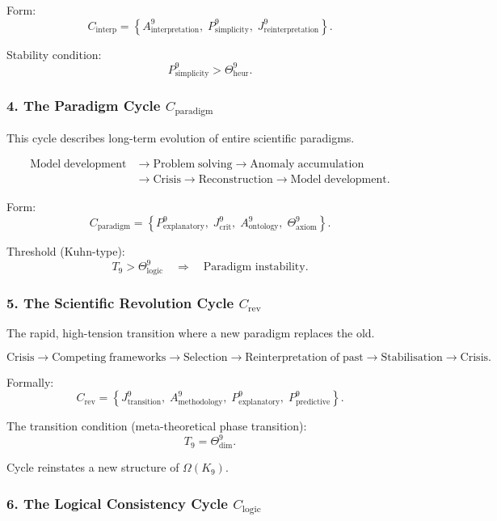 Form:
\[
 C_{\mathrm{interp}}
  =
  \left\{
    A^9_{\mathrm{interpretation}},\;
    P^9_{\mathrm{simplicity}},\;
    J^9_{\mathrm{reinterpretation}}
  \right\}.
\]

Stability condition:
\[
  P^9_{\mathrm{simplicity}} >
  \Theta^9_{\mathrm{heur}}.
\]


\subsubsection{4. The Paradigm Cycle $C_{\mathrm{paradigm}}$}

This cycle describes long-term evolution of entire scientific paradigms.

\[
  \begin{aligned}
  \mathrm{Model\;development}
  &\to \mathrm{Problem\;solving}
  \to \mathrm{Anomaly\;accumulation}\\
  &\to \mathrm{Crisis}
  \to \mathrm{Reconstruction}
  \to \mathrm{Model\;development}.
  \end{aligned}
\]

Form:
\[
 C_{\mathrm{paradigm}}
  =
  \left\{
    P^9_{\mathrm{explanatory}},\;
    J^9_{\mathrm{crit}},\;
    A^9_{\mathrm{ontology}},\;
    \Theta^9_{\mathrm{axiom}}
  \right\}.
\]

Threshold (Kuhn-type):
\[
  T_9 > \Theta^9_\mathrm{logic}
  \quad\Rightarrow\quad
  \text{Paradigm instability}.
\]


\subsubsection{5. The Scientific Revolution Cycle $C_{\mathrm{rev}}$}

The rapid, high-tension transition where a new paradigm replaces the old.

\[
  \mathrm{Crisis}
  \to
  \mathrm{Competing\;frameworks}
  \to
  \mathrm{Selection}
  \to
  \mathrm{Reinterpretation\;of\;past}
  \to
  \mathrm{Stabilisation}
  \to
  \mathrm{Crisis}.
\]

Formally:
\[
 C_{\mathrm{rev}}
   =
   \left\{
     J^9_{\mathrm{transition}},\;
     A^9_{\mathrm{methodology}},\;
     P^9_{\mathrm{explanatory}},\;
     P^9_{\mathrm{predictive}}
   \right\}.
\]

The transition condition (meta-theoretical phase transition):
\[
  T_9 = \Theta^9_{\mathrm{dim}}.
\]

Cycle reinstates a new structure of $\Omega(K_9)$.


\subsubsection{6. The Logical Consistency Cycle $C_{\mathrm{logic}}$}

